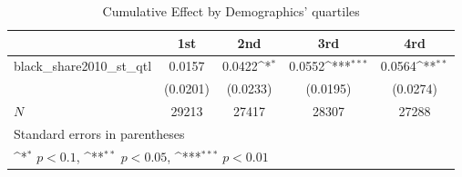 \begin{table}[htbp]\centering
\def\sym#1{\ifmmode^{#1}\else\(^{#1}\)\fi}
\caption{Cumulative Effect by Demographics' quartiles}
\begin{tabular}{l*{4}{c}}
\hline\hline
            &\multicolumn{1}{c}{1st}&\multicolumn{1}{c}{2nd}&\multicolumn{1}{c}{3rd}&\multicolumn{1}{c}{4rd}\\
\hline
black\_share2010\_st\_qtl&      0.0157         &      0.0422\sym{*}  &      0.0552\sym{***}&      0.0564\sym{**} \\
            &    (0.0201)         &    (0.0233)         &    (0.0195)         &    (0.0274)         \\
\hline
\(N\)       &       29213         &       27417         &       28307         &       27288         \\
\hline\hline
\multicolumn{5}{l}{\footnotesize Standard errors in parentheses}\\
\multicolumn{5}{l}{\footnotesize \sym{*} \(p<0.1\), \sym{**} \(p<0.05\), \sym{***} \(p<0.01\)}\\
\end{tabular}
\end{table}
